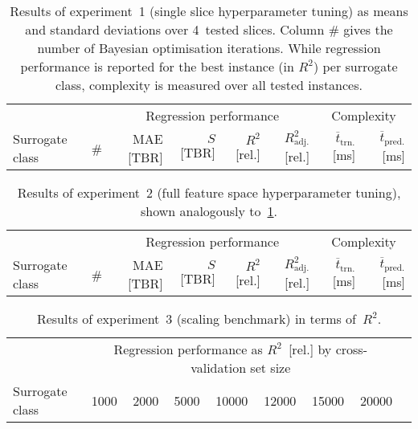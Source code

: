 \begin{table}[h]
	\centering
	{\footnotesize
		\begin{tabular}{lrrrrrrr}
		\toprule
		{} & {} & \multicolumn{4}{c}{Regression performance} &
		\multicolumn{2}{c}{Complexity}\\
		\cmidrule(lr){3-6}
		\cmidrule(lr){7-8}
		Surrogate class & \# & MAE [TBR] & $S$ [TBR] & $R^2$ [rel.] & $R^2_{\text{adj.}}$ [rel.]
						& $\overline{t}_{\text{trn.}}$ [ms] &
						$\overline{t}_{\text{pred.}}$ [ms]\\
		\midrule
		
		\bottomrule
		\end{tabular}
	}
	\caption{Results of experiment~1 (single slice hyperparameter tuning) as
		means and standard deviations over 4~tested slices. Column \# gives the number of Bayesian
		optimisation iterations. While regression performance is reported for the
		best instance (in $R^2$) per surrogate class, complexity is measured over all tested instances.}
	\label{tbl:exp1-detailed-results}
\end{table}

\begin{table}[h]
	\centering
	{\footnotesize
		\begin{tabular}{lrrrrrrr}
		\toprule
		{} & {} & \multicolumn{4}{c}{Regression performance} &
		\multicolumn{2}{c}{Complexity}\\
		\cmidrule(lr){3-6}
		\cmidrule(lr){7-8}
		Surrogate class & \# & MAE [TBR] & $S$ [TBR] & $R^2$ [rel.] & $R^2_{\text{adj.}}$ [rel.]
						& $\overline{t}_{\text{trn.}}$ [ms] &
						$\overline{t}_{\text{pred.}}$ [ms]\\
		\midrule
		
		\bottomrule
		\end{tabular}
	}
	\caption{Results of experiment~2 (full feature space hyperparameter tuning),
		shown analogously to~\cref{tbl:exp1-detailed-results}.}
	\label{tbl:exp2-detailed-results}
\end{table}

\begin{table}[h]
	\centering
	{\footnotesize
		\begin{tabular}{lrrrrrrrr}
		\toprule
		{} & \multicolumn{7}{c}{Regression performance as $R^2$~[rel.] by cross-validation set size}\\
		\cmidrule(lr){2-8}
		Surrogate class
						& \num{1000}
						& \num{2000}
						& \num{5000}
						& \num{10000}
						& \num{12000}
						& \num{15000}
						& \num{20000}\\
		\midrule
		
		\bottomrule
		\end{tabular}
	}
	\caption{Results of experiment~3 (scaling benchmark) in terms of~$R^2$.}
	\label{tbl:exp3-detailed-results-r2}
\end{table}

